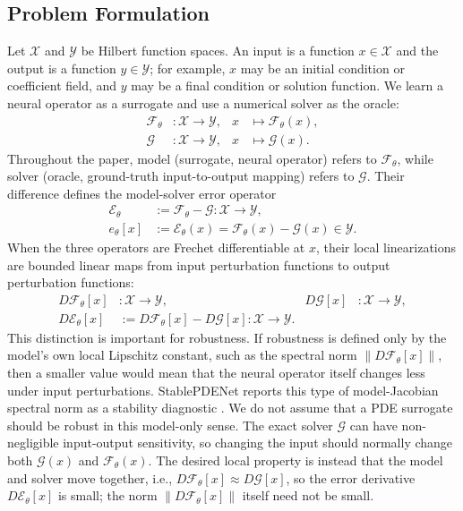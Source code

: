 \documentclass[letterpaper]{article} %
\begin{document}
\subsection{Problem Formulation}

Let $\mathcal{X}$ and $\mathcal{Y}$ be Hilbert function spaces. An input is a
function $x\in\mathcal{X}$ and the output is a function $y\in\mathcal{Y}$; for
example, $x$ may be an initial condition or coefficient field, and $y$ may be a
final condition or solution function. We learn a neural operator as a surrogate
and use a numerical solver as the oracle:
\begin{align}
  \mathcal{F}_\theta &: \mathcal{X}\to\mathcal{Y},
  &x&\mapsto \mathcal{F}_\theta(x),
  \nonumber\\
  \mathcal{G} &: \mathcal{X}\to\mathcal{Y},
  &x&\mapsto \mathcal{G}(x).
\end{align}
Throughout the paper, model (surrogate, neural operator) refers to
$\mathcal{F}_\theta$, while solver (oracle, ground-truth input-to-output mapping)
refers to $\mathcal{G}$. Their difference defines the model-solver error operator
\begin{align}
  \mathcal{E}_\theta
  &:=
  \mathcal{F}_\theta-\mathcal{G}
  :
  \mathcal{X}\to\mathcal{Y},
  \nonumber\\
  e_\theta[x]
  &:=
  \mathcal{E}_\theta(x)
  =
  \mathcal{F}_\theta(x)-\mathcal{G}(x)\in\mathcal{Y}.
\end{align}
When the three operators are Frechet differentiable at $x$, their local
linearizations are bounded linear maps from input perturbation functions to
output perturbation functions:
\begin{align}
  D\mathcal{F}_\theta[x] &: \mathcal{X}\to\mathcal{Y},
  &
  D\mathcal{G}[x] &: \mathcal{X}\to\mathcal{Y},
  \nonumber\\
  D\mathcal{E}_\theta[x]
  &:=
  D\mathcal{F}_\theta[x]-D\mathcal{G}[x]
  :
  \mathcal{X}\to\mathcal{Y}.
\end{align}
This distinction is important for robustness.  If robustness is defined only by
the model's own local Lipschitz constant, such as the spectral norm
\(\|D\mathcal{F}_\theta[x]\|\), then a smaller value would mean that the neural
operator itself changes less under input perturbations.  StablePDENet reports
this type of model-Jacobian spectral norm as a stability diagnostic
\citep{huang2026stablepdenet}.  We do not assume that a PDE surrogate should be
robust in this model-only sense.  The exact solver \(\mathcal{G}\) can have
non-negligible input-output sensitivity, so changing the input should normally
change both \(\mathcal{G}(x)\) and \(\mathcal{F}_\theta(x)\).  The desired local
property is instead that the model and solver move together, i.e.,
\(D\mathcal{F}_\theta[x]\approx D\mathcal{G}[x]\), so the error derivative
\(D\mathcal{E}_\theta[x]\) is small; the norm
\(\|D\mathcal{F}_\theta[x]\|\) itself need not be small.
\end{document}
